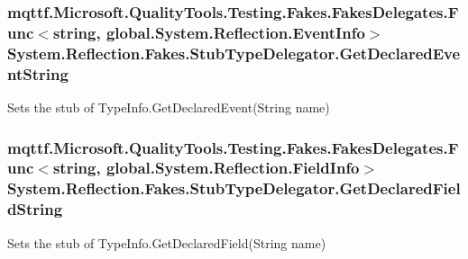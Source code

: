 \hypertarget{class_system_1_1_reflection_1_1_fakes_1_1_stub_type_delegator_a9bf9a73f772ec880c675ee6cb0c2babb}{
\subsubsection[{Get\-Declared\-Event\-String}]{\setlength{\rightskip}{0pt plus 5cm}mqttf.\-Microsoft.\-Quality\-Tools.\-Testing.\-Fakes.\-Fakes\-Delegates.\-Func$<$string, global.\-System.\-Reflection.\-Event\-Info$>$ System.\-Reflection.\-Fakes.\-Stub\-Type\-Delegator.\-Get\-Declared\-Event\-String}}\label{class_system_1_1_reflection_1_1_fakes_1_1_stub_type_delegator_a9bf9a73f772ec880c675ee6cb0c2babb}


Sets the stub of Type\-Info.\-Get\-Declared\-Event(\-String name)

\hypertarget{class_system_1_1_reflection_1_1_fakes_1_1_stub_type_delegator_a9e5093426967e4108fa7abdcbc7b1594}{
\subsubsection[{Get\-Declared\-Field\-String}]{\setlength{\rightskip}{0pt plus 5cm}mqttf.\-Microsoft.\-Quality\-Tools.\-Testing.\-Fakes.\-Fakes\-Delegates.\-Func$<$string, global.\-System.\-Reflection.\-Field\-Info$>$ System.\-Reflection.\-Fakes.\-Stub\-Type\-Delegator.\-Get\-Declared\-Field\-String}}\label{class_system_1_1_reflection_1_1_fakes_1_1_stub_type_delegator_a9e5093426967e4108fa7abdcbc7b1594}


Sets the stub of Type\-Info.\-Get\-Declared\-Field(\-String name)

